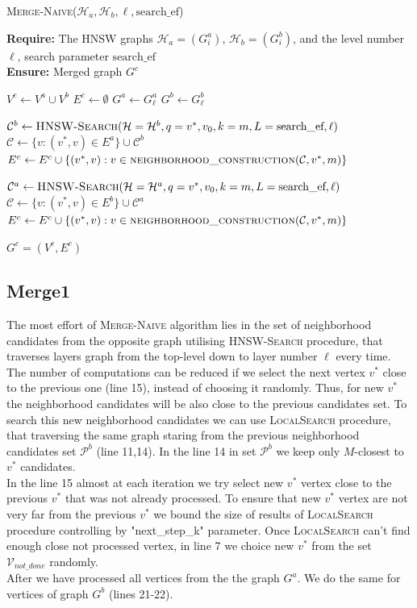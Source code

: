 \documentclass{article}
\begin{document}
\begin{algorithm}
\caption{\textsc{Merge-Naive}($\mathcal{H}_a, \mathcal{H}_b,  \ell, \text{search\_ef}$)}\label{alg:merge_naive}
\textbf{Require:} The HNSW graphs $\mathcal{H}_a = (G^a_i)$, $\mathcal{H}_b = (G^b_i)$, and the level number $\ell$, search parameter $\text{search\_ef}$ \\
\textbf{Ensure:} Merged graph $G^c$ 
\begin{algorithmic}[1]
\State $V^c \gets V^a \cup V^b$
\State $E^c \gets \emptyset$
\State $G^a \gets G^a_{\ell}$
\State $G^b \gets G^b_{\ell}$

    \State $\mathcal{C}^b \gets \textsc{HNSW-Search}(\mathcal{H} = \mathcal{H}^b, q = v^*, v_0, k = m, L = \text{search\_ef}, \ell)$
    \State $\mathcal{C} \gets \{v : (v^*, v) \in E^a \} \cup \mathcal{C}^b$
    \State $E^c \gets E^c \cup \{(v^*, v) : v \in \textsc{neighborhood\_construction}(\mathcal{C}, v^*, m)\}$
\EndFor

    \State $\mathcal{C}^a \gets \textsc{HNSW-Search}(\mathcal{H} = \mathcal{H}^a, q = v^*, v_0, k = m, L = \text{search\_ef}, \ell)$
    \State $\mathcal{C} \gets \{v : (v^*, v) \in E^b \} \cup \mathcal{C}^a$
    \State $E^c \gets E^c \cup \{(v^*, v) : v \in \textsc{neighborhood\_construction}(\mathcal{C}, v^*, m)\}$
\EndFor

\State \Return $G^c = (V^c, E^c)$
\end{algorithmic}
\end{algorithm}

\subsection{Merge1}
The most effort of \textsc{Merge-Naive} algorithm lies in the set of neighborhood candidates from the opposite graph utilising \textsc{HNSW-Search} procedure, that traverses layers graph from the top-level down to layer number $\ell$ every time. The number of computations can be reduced if we select the next vertex $v^*$ close to the previous one (line 15), instead of choosing it randomly. Thus, for new $v^*$ the neighborhood candidates will be  also close to the previous candidates set. To search this new neighborhood candidates we can use \textsc{LocalSearch} procedure, that traversing the same graph staring from the previous neighborhood candidates set $\mathcal{P}^b$ (line 11,14). In the line 14 in set $\mathcal{P}^b$ we keep only $M$-closest to $v^*$ candidates.\\
In the line 15 almost at each iteration we try select new $v^*$ vertex close to the previous  $v^*$ that was not already processed.  
To ensure that new $v^*$ vertex are not very far from the previous $v^*$ we bound the size of results of \textsc{LocalSearch} procedure controlling by "next\_step\_k" parameter. Once \textsc{LocalSearch} can't find enough close not processed vertex, in line 7 we choice new $v^*$ from the set $\mathcal{V}_{not\_done}$ randomly. \\
After we have processed all vertices from the the graph $G^a$. We do the same for vertices of graph $G^b$ (lines 21-22).  
\end{document}
